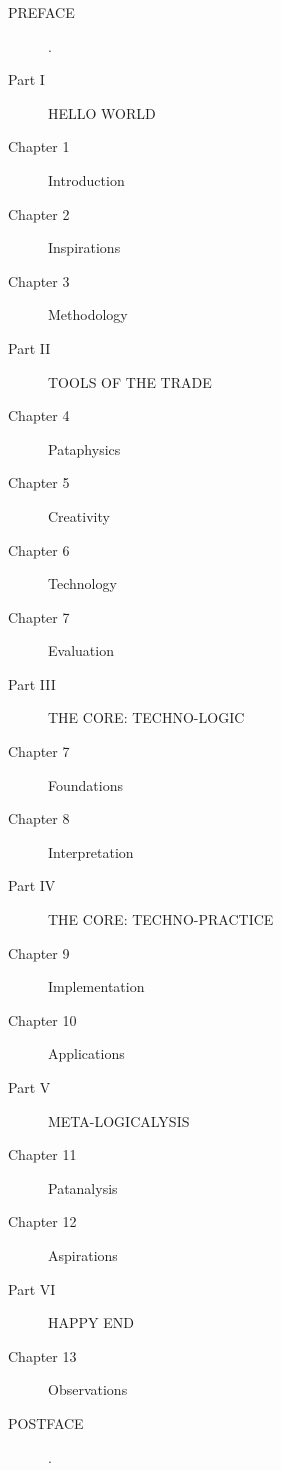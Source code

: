 \spirals

\begin{description}
  \item[PREFACE] .
  \item[Part I] HELLO WORLD
  \item[Chapter 1] Introduction
  \item[Chapter 2] Inspirations
  \item[Chapter 3] Methodology
  \item[Part II] TOOLS OF THE TRADE
  \item[Chapter 4] Pataphysics
  \item[Chapter 5] Creativity
  \item[Chapter 6] Technology
  \item[Chapter 7] Evaluation
  \item[Part III] THE CORE: TECHNO-LOGIC
  \item[Chapter 7] Foundations
  \item[Chapter 8] Interpretation
  \item[Part IV] THE CORE: TECHNO-PRACTICE
  \item[Chapter 9] Implementation
  \item[Chapter 10] Applications
  \item[Part V] META-LOGICALYSIS
  \item[Chapter 11] Patanalysis
  \item[Chapter 12] Aspirations
  \item[Part VI] HAPPY END
  \item[Chapter 13] Observations
  \item[POSTFACE] .
\end{description}


\stopcontents[chapters]
